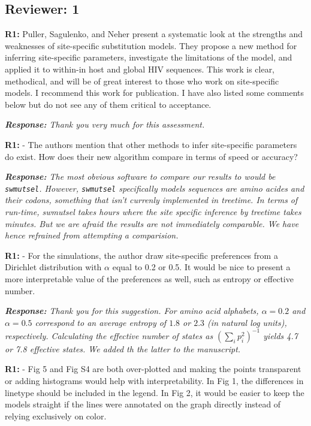 \documentclass[aps,rmp,onecolumn]{revtex4-1}
\newcommand{\refa}[1]{\textbf{R1:} #1}
\newcommand{\response}[1]{{\it {\color{response}\textbf{Response:} #1}}}
\begin{document}
\subsection*{Reviewer: 1}

\refa{Puller, Sagulenko, and Neher present a systematic look at the strengths and weaknesses of site-specific substitution models. They propose a new method for inferring site-specific parameters, investigate the limitations of the model, and applied it to within-in host and global HIV sequences. This work is clear, methodical, and will be of great interest to those who work on site-specific models. I recommend this work for publication. I have also listed some comments below but do not see any of them critical to acceptance.}

\response{Thank you very much for this assessment.}

\refa{- The authors mention that other methods to infer site-specific parameters do exist. How does their new algorithm compare in terms of speed or accuracy?}

\response{The most obvious software to compare our results to would be \texttt{swmutsel}.
However, \texttt{swmutsel} specifically models sequences are amino acides and their codons, something that isn't currenly implemented in treetime. In terms of run-time, swmutsel takes hours where the site specific inference by treetime takes minutes.
But we are afraid the results are not immediately comparable.
We have hence refrained from attempting a comparision.
}


\refa{- For the simulations, the author draw site-specific preferences from a Dirichlet distribution with $\alpha$ equal to 0.2 or 0.5. It would be nice to present a more interpretable value of the preferences as well, such as entropy or effective number.}

\response{
Thank you for this suggestion.
For amino acid alphabets, $\alpha=0.2$ and $\alpha=0.5$ correspond to an average entropy of $1.8$ or $2.3$ (in natural log units), respectively.
Calculating the effective number of states as $\left(\sum_i p_i^2\right)^{-1}$ yields 4.7 or 7.8 effective states.
We added th the latter to the manuscript.}


\refa{- Fig 5 and Fig S4 are both over-plotted and making the points transparent or adding histograms would help with interpretability. In Fig 1, the differences in linetype should be included in the legend. In Fig 2, it would be easier to keep the models straight if the lines were annotated on the graph directly instead of relying exclusively on color.}
\end{document}
